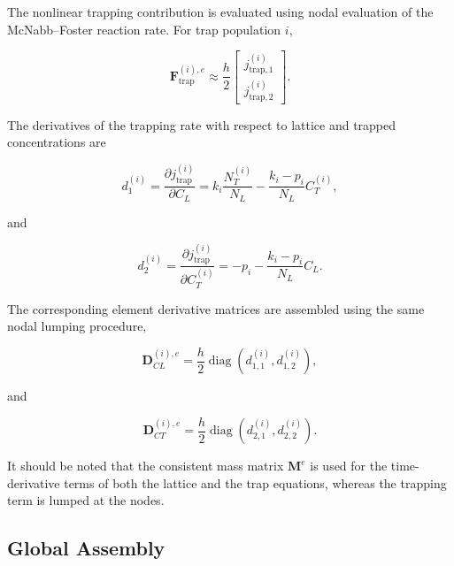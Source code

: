 \documentclass[a4paper,12pt,oneside]{report}
\begin{document}
The nonlinear trapping contribution is evaluated using nodal
evaluation of the McNabb--Foster reaction rate. For trap population
$i$,

\begin{equation}
\mathbf{F}_{\mathrm{trap}}^{(i),e}
\approx
\frac{h}{2}
\begin{bmatrix}
j_{\mathrm{trap},1}^{(i)}\\
j_{\mathrm{trap},2}^{(i)}
\end{bmatrix}.
\label{eq:ch3_trap_vector}
\end{equation}

The derivatives of the trapping rate with respect to lattice and
trapped concentrations are

\begin{equation}
d_1^{(i)}
=
\frac{\partial j_{\mathrm{trap}}^{(i)}}
{\partial C_L}
=
k_i\frac{N_T^{(i)}}{N_L}
-
\frac{k_i-p_i}{N_L}C_T^{(i)},
\label{eq:ch3_d1}
\end{equation}

and

\begin{equation}
d_2^{(i)}
=
\frac{\partial j_{\mathrm{trap}}^{(i)}}
{\partial C_T^{(i)}}
=
-p_i
-
\frac{k_i-p_i}{N_L}C_L.
\label{eq:ch3_d2}
\end{equation}

The corresponding element derivative matrices are assembled using
the same nodal lumping procedure,

\begin{equation}
\mathbf{D}_{CL}^{(i),e}
=
\frac{h}{2}
\operatorname{diag}
\left(
d_{1,1}^{(i)},d_{1,2}^{(i)}
\right),
\end{equation}

and

\begin{equation}
\mathbf{D}_{CT}^{(i),e}
=
\frac{h}{2}
\operatorname{diag}
\left(
d_{2,1}^{(i)},d_{2,2}^{(i)}
\right).
\end{equation}

It should be noted that the consistent mass matrix
$\mathbf{M}^e$ is used for the time-derivative terms of both the lattice
and the trap equations, whereas the trapping term is lumped at the nodes.

\subsection{Global Assembly}
\end{document}
